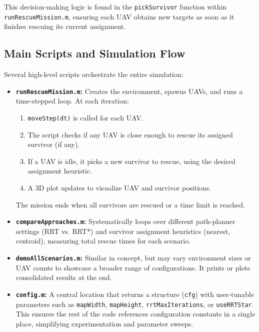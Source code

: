 \documentclass[12pt,a4paper]{report}
\begin{document}
This decision-making logic is found in the \texttt{pickSurvivor} function within 
\texttt{runRescueMission.m}, ensuring each UAV obtains new targets as soon as it 
finishes rescuing its current assignment.

\subsection{Main Scripts and Simulation Flow}
\label{sec:main_scripts}
Several high-level scripts orchestrate the entire simulation:

\begin{itemize}
    \item \textbf{\texttt{runRescueMission.m}:}
          Creates the environment, spawns UAVs, and runs a time-stepped loop. At each 
          iteration:
          \begin{enumerate}
              \item \texttt{moveStep(dt)} is called for each UAV.
              \item The script checks if any UAV is close enough to rescue its assigned 
                    survivor (if any).
              \item If a UAV is idle, it picks a new survivor to rescue, using the 
                    desired assignment heuristic.
              \item A 3D plot updates to visualize UAV and survivor positions.
          \end{enumerate}
          The mission ends when all survivors are rescued or a time limit is reached.

    \item \textbf{\texttt{compareApproaches.m}:}
          Systematically loops over different path-planner settings (RRT vs. RRT*) and 
          survivor assignment heuristics (nearest, centroid), measuring total rescue 
          times for each scenario.

    \item \textbf{\texttt{demoAllScenarios.m}:}
          Similar in concept, but may vary environment sizes or UAV counts to showcase 
          a broader range of configurations. It prints or plots consolidated results 
          at the end.

    \item \textbf{\texttt{config.m}:}
          A central location that returns a structure (\texttt{cfg}) with user-tunable 
          parameters such as \texttt{mapWidth}, \texttt{mapHeight}, \texttt{rrtMaxIterations}, 
          or \texttt{useRRTStar}. This ensures the rest of the code references 
          configuration constants in a single place, simplifying experimentation and 
          parameter sweeps.
\end{itemize}
\end{document}
